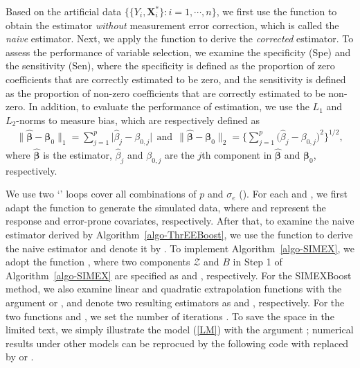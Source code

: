 Based on the artificial data $\Big\{ \{Y_i,\mathbf{X}_i^\ast\} : i=1,\cdots,n \Big\}$, we first use the function  to obtain the estimator {\em without} measurement error correction, which is called the {\it naive} estimator. Next, we apply the function  to derive the {\it corrected} estimator. To assess the performance of variable selection, we examine the specificity (Spe) and the sensitivity (Sen), where the specificity is defined as the proportion of zero coefficients that are correctly estimated to be zero, and the sensitivity is defined as the proportion of non-zero coefficients that are correctly estimated to be non-zero. In addition, to evaluate the performance of estimation, we use the $L_1$ and $L_2$-norms to {measure bias}, which are respectively defined as
\begin{eqnarray} \label{eva-bias}
\big\| \widehat{\boldsymbol{\beta}} - \boldsymbol{\beta}_0 \big\|_1 = \sum \limits_{j=1}^p \big| \widehat{\beta}_j - \beta_{0,j} \big| \ \ \text{and} \ \ \big\| \widehat{\boldsymbol{\beta}} - \boldsymbol{\beta}_0 \big\|_2 = \bigg\{\sum \limits_{j=1}^p \big( \widehat{\beta}_j - \beta_{0,j} \big)^2 \bigg\}^{1/2},
\end{eqnarray}
where $\widehat{\boldsymbol{\beta}}$ is the estimator, $\widehat{\beta}_j$ and $\beta_{0,j}$ are the $j$th component in $\widehat{\boldsymbol{\beta}}$ and $\boldsymbol{\beta}_0$, respectively.


{We use} two `' loops cover all {combinations} of $p$ and $\sigma_e$ (). For each  and , we first {adapt} the function  to generate the simulated data, where  and  represent the response and error-prone covariates, respectively. After that, to examine the naive estimator derived by Algorithm~\ref{algo-ThrEEBoost}, we use the function  to derive the naive estimator and denote it by . To implement Algorithm~\ref{algo-SIMEX}, we adopt the function , where two components $\mathcal{Z}$ and $B$ in Step 1 of Algorithm~\ref{algo-SIMEX} are specified as  and , respectively. For the SIMEXBoost method, we also examine linear and quadratic extrapolation functions with the argument  or , and denote two resulting estimators as  and , respectively. For the two functions  and , we set the number of iterations . To save the space in the limited text, we simply illustrate the model (\ref{LM}) with the argument ; numerical results under other models can be reprocued by the following code with  replaced by  or .


